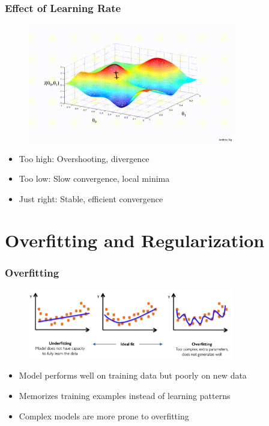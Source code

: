 \documentclass{beamer}
\begin{document}
\begin{frame}
\frametitle{Effect of Learning Rate}
\begin{figure}
\includegraphics[width=0.8\textwidth]{sgd.gif}
\end{figure}

\begin{itemize}
    \item Too high: Overshooting, divergence
    \item Too low: Slow convergence, local minima
    \item Just right: Stable, efficient convergence
\end{itemize}
\end{frame}

\section{Overfitting and Regularization}

\begin{frame}
\frametitle{Overfitting}
\begin{figure}
\includegraphics[width=0.8\textwidth]{overfitting.png}
\end{figure}

\begin{itemize}
    \item Model performs well on training data but poorly on new data
    \item Memorizes training examples instead of learning patterns
    \item Complex models are more prone to overfitting
\end{itemize}
\end{frame}
\end{document}
